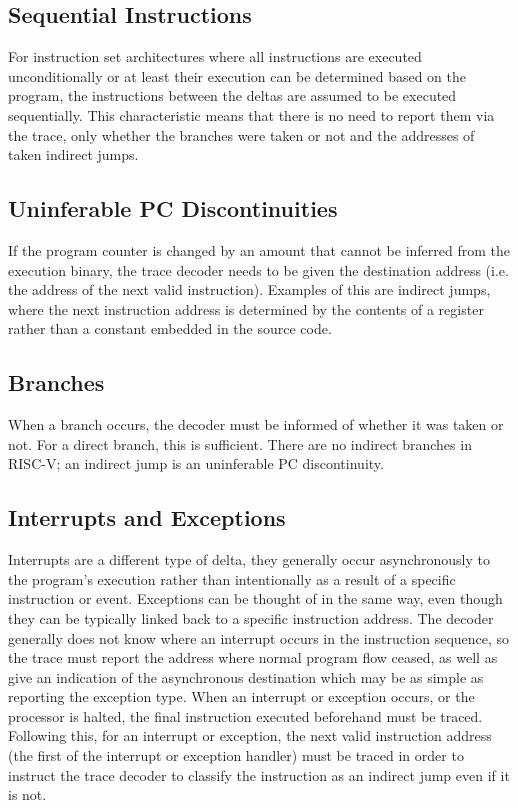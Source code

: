 \subsection{Sequential Instructions} \label{Sequential Instructions}

For instruction set architectures where all instructions are executed
unconditionally or at least their execution can be determined based on
the program, the instructions between the deltas are assumed to be
executed sequentially. This characteristic means that there is no need
to report them via the trace, only whether the branches were taken or not
and the addresses of taken indirect jumps.

\subsection{Uninferable PC Discontinuities} \label{uninfpc}

If the program counter is changed by an amount that cannot be
inferred from the execution binary, the trace decoder needs to be
given the destination address (i.e. the address of the next valid
instruction).  Examples of this are indirect jumps, where
the next instruction address is determined by the contents of a
register rather than a constant embedded in the source code.

\subsection{Branches} \label{branches}

When a branch occurs, the decoder must be informed of whether it was
taken or not.  For a direct branch, this is sufficient.  There are no
indirect branches in RISC-V; an indirect jump is an uninferable PC
discontinuity.

\subsection{Interrupts and Exceptions} \label{interruptsexceptions}

Interrupts are a different type of delta, they generally occur
asynchronously to the program's execution rather than intentionally as
a result of a specific instruction or event. Exceptions can be thought
of in the same way, even though they can be typically linked back to a
specific instruction address.  The decoder generally does not know
where an interrupt occurs in the instruction sequence, so the trace
must report the address where normal program flow ceased, as well as
give an indication of the asynchronous destination which may be as
simple as reporting the exception type.  When an interrupt or
exception occurs, or the processor is halted, the final instruction
executed beforehand must be traced.  Following this, for an interrupt
or exception, the next valid instruction address (the first of the
interrupt or exception handler) must be traced in order to instruct the
trace decoder to classify the instruction as an indirect jump even
if it is not.

